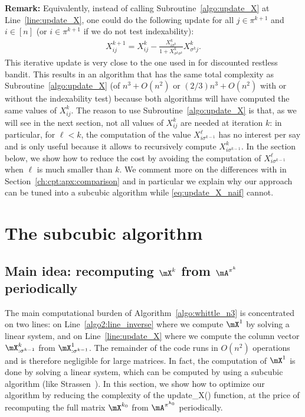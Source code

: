 \textbf{Remark:} Equivalently, instead of calling Subroutine~\ref{algo:update_X} at Line~\ref{line:update_X}, one could do the following update for all $j\in\pi^{k+1}$ and $i\in[n]$ (or $i\in\pi^{k+1}$ if we do not test indexability):
\begin{align}
    X_{ij}^{k+1} = X_{ij}^{k} -\displaystyle\frac{X^{k}_{i\sigma^{k}}}{1+X^{k}_{\sigma^{k}\sigma^{k}}}X^{k}_{\sigma^{k}j}. \label{eq:update_X_naif}
\end{align}
This iterative update is very close to the one used in \cite{akbarzadeh2020conditions,nino2020fast} for discounted restless bandit. This results in an algorithm that has the same total complexity as Subroutine~\ref{algo:update_X} (of $n^3+O(n^2)$ or $(2/3)n^3+O(n^2)$ with or without the indexability test) because both algorithms will have computed the same values of $X^{k}_{ij}$. The reason to use Subroutine~\ref{algo:update_X} is that, as we will see in the next section, not all values of $X^{k}_{ij}$ are needed at iteration $k$: in particular, for $\ell<k$, the computation of the value $X^\ell_{i\sigma^{k-1}}$ has no interest per say and is only useful because it allows to recursively compute $X^{k}_{i\sigma^{k-1}}$. In the section below, we show how to reduce the cost by avoiding the computation of $X^\ell_{i\sigma^{k-1}}$ when $\ell$ is much smaller than $k$. We comment more on the differences with \cite{akbarzadeh2020conditions,nino2020fast} in Section~\ref{ch:cpt:apx:comparison} and in particular we explain why our approach can be tuned into a subcubic algorithm while \eqref{eq:update_X_naif} cannot.

\section{The subcubic algorithm}
\label{sec:subcubic algorithm}

\subsection{Main idea: recomputing \texorpdfstring{$\mX^{k}$ from $\mA^{\pi^k}$}{Xk from Apik} periodically}

The main computational burden of Algorithm~\ref{algo:whittle_n3} is concentrated on two lines: on Line~\ref{algo2:line_inverse} where we compute $\mX^1$ by solving a linear system, and on Line~\ref{line:update_X} where we compute the column vector $\mX^{k}_{:\sigma^{k-1}}$ from $\mX^1_{: \sigma^{k-1}}$. The remainder of the code runs in $O(n^2)$ operations and is therefore negligible for large matrices. In fact, the computation of $\mX^1$ is done by solving a linear system, which can be computed by using a subcubic algorithm (like Strassen~\cite{strassen1969gaussian}). In this section, we show how to optimize our algorithm by reducing the complexity of the update\_X() function, at the price of recomputing the full matrix $\mX^{k_0}$ from $\mA^{\pi^{k_0}}$ periodically.

